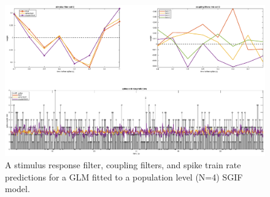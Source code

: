 \documentclass[mphil,deptreport,ianc]{infthesis} %
\begin{document}
\begin{figure}
    \hspace{-0.1\columnwidth}
    \includegraphics[width=1.2\columnwidth]{figures/matlab/export_GLM_filters_pred_bin_size_0_1_cell_2_target_GT_model_mesoGIF_N_4.eps}
    \caption{A stimulus response filter, coupling filters, and spike train rate predictions for a GLM fitted to a population level (N=4) SGIF model.}
    \label{fig:GLM_mesoGIF}
\end{figure}

\end{document}
